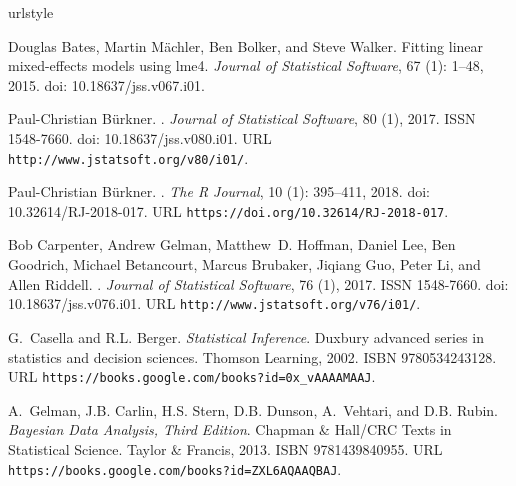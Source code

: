 \documentclass[11pt]{biorxiv}
\begin{document}
\begin{thebibliography}{14}
\providecommand{\natexlab}[1]{#1}
\providecommand{\url}[1]{\texttt{#1}}
\expandafter\ifx\csname urlstyle\endcsname\relax
  \providecommand{\doi}[1]{doi: #1}\else
  \providecommand{\doi}{doi: \begingroup \urlstyle{rm}\Url}\fi

Douglas Bates, Martin M{\"a}chler, Ben Bolker, and Steve Walker.
\newblock Fitting linear mixed-effects models using {lme4}.
\newblock \emph{Journal of Statistical Software}, 67 (1):
  1--48, 2015.
\newblock \doi{10.18637/jss.v067.i01}.

Paul-Christian B{\"{u}}rkner.
.
\newblock \emph{Journal of Statistical Software}, 80 (1), 2017.
\newblock ISSN 1548-7660.
\newblock \doi{10.18637/jss.v080.i01}.
\newblock URL \url{http://www.jstatsoft.org/v80/i01/}.

Paul-Christian B{\"{u}}rkner.
.
\newblock \emph{{The R Journal}}, 10 (1): 395--411, 2018.
\newblock \doi{10.32614/RJ-2018-017}.
\newblock URL \url{https://doi.org/10.32614/RJ-2018-017}.

Bob Carpenter, Andrew Gelman, Matthew~D. Hoffman, Daniel Lee, Ben Goodrich,
  Michael Betancourt, Marcus Brubaker, Jiqiang Guo, Peter Li, and Allen
  Riddell.
.
\newblock \emph{Journal of Statistical Software}, 76 (1), 2017.
\newblock ISSN 1548-7660.
\newblock \doi{10.18637/jss.v076.i01}.
\newblock URL \url{http://www.jstatsoft.org/v76/i01/}.

G.~Casella and R.L. Berger.
\newblock \emph{Statistical Inference}.
\newblock Duxbury advanced series in statistics and decision sciences. Thomson
  Learning, 2002.
\newblock ISBN 9780534243128.
\newblock URL \url{https://books.google.com/books?id=0x\_vAAAAMAAJ}.

A.~Gelman, J.B. Carlin, H.S. Stern, D.B. Dunson, A.~Vehtari, and D.B. Rubin.
\newblock \emph{Bayesian Data Analysis, Third Edition}.
\newblock Chapman \& Hall/CRC Texts in Statistical Science. Taylor \& Francis,
  2013.
\newblock ISBN 9781439840955.
\newblock URL \url{https://books.google.com/books?id=ZXL6AQAAQBAJ}.


\end{thebibliography}
\end{document}
